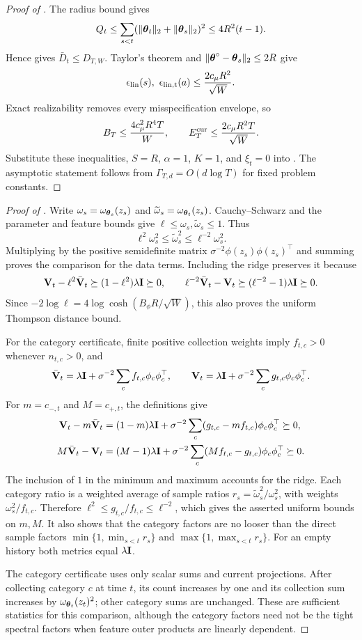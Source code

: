 \begin{proof}[Proof of ]
The radius bound gives
\[
 Q_t\le\sum_{s<t}
 (\|\boldsymbol{\theta}_t\|_2+\|\boldsymbol{\theta}_s\|_2)^2
 \le4R^2(t-1).
\]
Hence  gives
$\bar D_t\le D_{T,W}$.  Taylor's theorem and
$\|\boldsymbol{\theta}^\circ-\boldsymbol{\theta}_s\|_2\le2R$ give
\[
 \epsilon_{\rm lin}(s),\ \epsilon_{\rm lin,t}(a)
 \le\frac{2c_\mu R^2}{\sqrt W}.
\]
Exact realizability removes every misspecification envelope, so
\[
 B_T\le\frac{4c_\mu^2R^4T}{W},\qquad
 E_T^{\rm cur}\le\frac{2c_\mu R^2T}{\sqrt W}.
\]
Substitute these inequalities, $S=R$, $\alpha=1$, $K=1$, and $\xi_t=0$
into .  The asymptotic statement follows from
$\Gamma_{T,d}=O(d\log T)$ for fixed problem constants.
\end{proof}

\begin{proof}[Proof of ]
Write $\omega_s=\omega_{\boldsymbol{\theta}_s}(z_s)$ and
$\widetilde\omega_s=\omega_{\boldsymbol{\theta}_t}(z_s)$.  Cauchy--Schwarz and the parameter
and feature bounds give $\ell\le\omega_s,\widetilde\omega_s\le1$.  Thus
\[
 \ell^2\omega_s^2\le\widetilde\omega_s^2
 \le\ell^{-2}\omega_s^2.
\]
Multiplying by the positive semidefinite matrix
$\sigma^{-2}\phi(z_s)\phi(z_s)^\top$ and summing proves the comparison for the
data terms.  Including the ridge preserves it because
\[
 \mathbf{V}_t-\ell^2\bar{\mathbf{V}}_t\succeq(1-\ell^2)\lambda\mathbf{I}\succeq0,
 \qquad
 \ell^{-2}\bar{\mathbf{V}}_t-\mathbf{V}_t
 \succeq(\ell^{-2}-1)\lambda\mathbf{I}\succeq0.
\]
Since $-2\log\ell=4\log\cosh(B_\phi R/\sqrt W)$, this also proves the uniform
Thompson distance bound.

For the category certificate, finite positive collection weights imply
$f_{t,c}>0$ whenever $n_{t,c}>0$, and
\[
 \bar{\mathbf{V}}_t=\lambda\mathbf{I}+\sigma^{-2}\sum_c f_{t,c}\phi_c\phi_c^\top,
 \qquad
 \mathbf{V}_t=\lambda\mathbf{I}+\sigma^{-2}\sum_c g_{t,c}\phi_c\phi_c^\top.
\]
For $m=c_{-,t}$ and $M=c_{+,t}$, the definitions give
\begin{align*}
 \mathbf{V}_t-m\bar{\mathbf{V}}_t
 &=(1-m)\lambda\mathbf{I}+\sigma^{-2}\sum_c(g_{t,c}-mf_{t,c})\phi_c\phi_c^\top
 \succeq0,\\
 M\bar{\mathbf{V}}_t-\mathbf{V}_t
 &=(M-1)\lambda\mathbf{I}+\sigma^{-2}\sum_c(Mf_{t,c}-g_{t,c})\phi_c\phi_c^\top
 \succeq0.
\end{align*}
The inclusion of $1$ in the minimum and maximum accounts for the ridge.
Each category ratio is a weighted average of sample ratios
$r_s=\widetilde\omega_s^2/\omega_s^2$, with weights
$\omega_s^2/f_{t,c}$.  Therefore $\ell^2\le g_{t,c}/f_{t,c}\le\ell^{-2}$,
which gives the asserted uniform bounds on $m,M$.  It also shows that the
category factors are no looser than the direct sample factors
$\min\{1,\min_{s<t}r_s\}$ and $\max\{1,\max_{s<t}r_s\}$.
For an empty history both metrics equal $\lambda\mathbf{I}$.

The category certificate uses only scalar sums and current projections.
After collecting category $c$ at time $t$, its count increases by one and its
collection sum increases by $\omega_{\boldsymbol{\theta}_t}(z_t)^2$; other category sums
are unchanged.  These are sufficient statistics for this comparison, although
the category factors need not be the tight spectral factors when feature
outer products are linearly dependent.
\end{proof}

